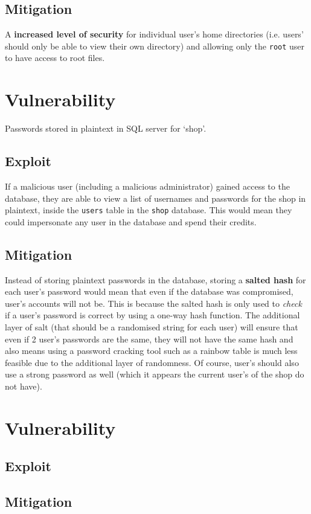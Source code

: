 \documentclass[11pt]{article}
\begin{document}
\subsection{Mitigation}

A \textbf{increased level of security} for individual user's home directories (i.e. users' should only be able to view their own directory) and allowing only the \texttt{root} user to have access to root files.

\section{Vulnerability}

Passwords stored in plaintext in SQL server for `shop'.

\subsection{Exploit}

If a malicious user (including a malicious administrator) gained access to the database, they are able to view a list of usernames and passwords for the shop in plaintext, inside the \texttt{users} table in the \texttt{shop} database. This would mean they could impersonate any user in the database and spend their credits.

\subsection{Mitigation}

Instead of storing plaintext passwords in the database, storing a \textbf{salted hash} for each user's password would mean that even if the database was compromised, user's accounts will not be. This is because the salted hash is only used to \textit{check} if a user's password is correct by using a one-way hash function. The additional layer of salt (that should be a randomised string for each user) will ensure that even if 2 user's passwords are the same, they will not have the same hash and also means using a password cracking tool such as a rainbow table is much less feasible due to the additional layer of randomness. Of course, user's should also use a strong password as well (which it appears the current user's of the shop do not have).

\section{Vulnerability}

\subsection{Exploit}

\subsection{Mitigation}
\end{document}
